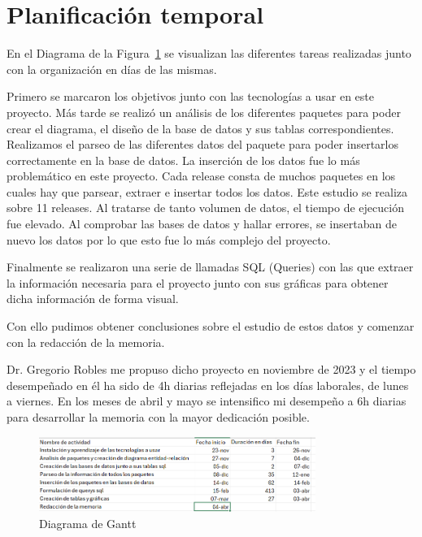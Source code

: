 \documentclass[a4paper, 12pt]{book}
\begin{document}
\section{Planificación temporal}
\label{sec:planificacion-temporal}

En el Diagrama de la Figura~\ref{fig:diagrama_gantt} se visualizan las diferentes tareas realizadas junto con la organización en días de las mismas. 

Primero se marcaron los objetivos junto con las tecnologías a usar en este proyecto.
Más tarde se realizó un análisis de los diferentes paquetes para poder crear el diagrama, el diseño de la base de datos y sus tablas correspondientes.
Realizamos el parseo de las diferentes datos del paquete para poder insertarlos correctamente en la base de datos.
La inserción de los datos fue lo más problemático en este proyecto. Cada release consta de muchos paquetes en los cuales hay que parsear, extraer e insertar todos los datos. Este estudio se realiza sobre 11 releases. Al tratarse de tanto volumen de datos, el tiempo de ejecución fue elevado. Al comprobar las bases de datos y hallar errores, se insertaban de nuevo los datos por lo que esto fue lo más complejo del proyecto.

Finalmente se realizaron una serie de llamadas SQL (Queries) con las que extraer la información necesaria para el proyecto junto con sus gráficas para obtener dicha información de forma visual.

Con ello pudimos obtener conclusiones sobre el estudio de estos datos y comenzar con la redacción de la memoria.

Dr. Gregorio Robles me propuso dicho proyecto en noviembre de 2023 y el tiempo desempeñado en él ha sido de 4h diarias reflejadas en los días laborales, de lunes a viernes. En los meses de abril y mayo se intensifico mi desempeño a 6h diarias para desarrollar la memoria con la mayor dedicación posible.

\begin{figure}
	\centering
	\includegraphics[width=9cm, keepaspectratio]{img/Gantt.png}
	\caption{Diagrama de Gantt}
	\label{fig:diagrama_gantt}
\end{figure}

\end{document}
